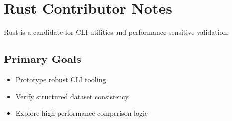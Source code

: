 \section{Rust Contributor Notes}

Rust is a candidate for CLI utilities and performance-sensitive validation.

\subsection{Primary Goals}
\begin{itemize}
  \item Prototype robust CLI tooling
  \item Verify structured dataset consistency
  \item Explore high-performance comparison logic
\end{itemize}
